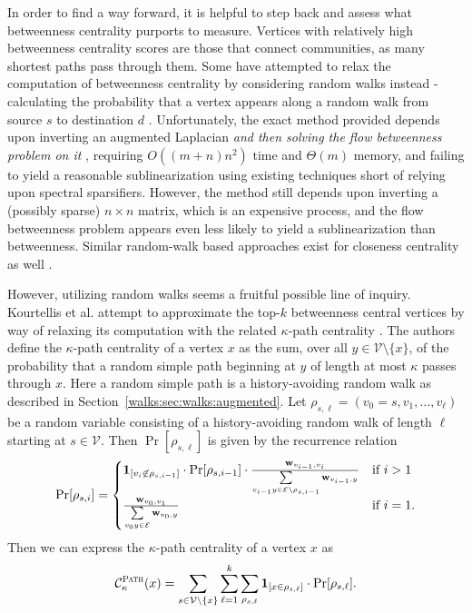 \documentclass[10]{report}
\newcommand{\algoname}[1]{\textnormal{\textsc{#1}}}
\begin{document}
In order to find a way forward, it is helpful to step back and assess what betweenness centrality purports to measure.
Vertices with relatively high betweenness centrality scores are those that connect communities, as many shortest paths pass through them.
Some have attempted to relax the computation of betweenness centrality by considering random walks instead - calculating the probability that a vertex appears along a random walk from source $s$ to destination $d$ \cite{newman2005measure}.
Unfortunately, the exact method provided depends upon inverting an augmented Laplacian \emph{and then solving the flow betweenness problem  on it} \cite{freeman1991centrality}, requiring $O((m + n) n^2)$ time and $\Theta(m)$ memory, and failing to yield a reasonable sublinearization using existing techniques short of relying upon spectral sparsifiers.
However, the method still depends upon inverting a (possibly sparse) $n \times n$ matrix, which is an expensive process, and the flow betweenness problem appears even less likely to yield a sublinearization than betweenness.
Similar random-walk based approaches exist for closeness centrality as well \cite{noh2002stability}.

However, utilizing random walks seems a fruitful possible line of inquiry.
Kourtellis et al. attempt to approximate the top-$k$ betweenness central vertices by way of relaxing its computation with the related $\kappa$-path centrality \cite{alahakoon2011k, kourtellis2013identifying}.
The authors define the $\kappa$-path centrality of a vertex $x$ as the sum, over all $y \in \mathcal{V} \setminus \{x\}$, of the probability that a random simple path beginning at $y$ of length at most $\kappa$ passes through $x$. 
Here a random simple path is a history-avoiding random walk as described in Section~\ref{walks:sec:walks:augmented}.
Let $\rho_{s, \ell} = (v_0 = s, v_1, \dots, v_\ell)$ be a random variable consisting of a history-avoiding random walk of length $\ell$ starting at $s \in \mathcal{V}$. 
Then $\Pr [ \rho_{s, \ell}]$ is given by the recurrence relation
%
\begin{equation} \label{eq:path:unweighted}
	\Pr[\rho_{s, i}] = 
	\begin{cases}
		\mathbf{1}_{[v_i \not \in \rho_{s, i-1}]}
		\cdot
		\Pr [\rho_{s, i-1}] 
		\cdot 
		\frac{\mathbf{w}_{v_{i-1},v_i}}{\sum\limits_{v_{i-1} y \in \mathcal{E} \setminus \rho_{s, i-1}} \mathbf{w}_{v_{i-1}, y}}
			& \textnormal{if $i > 1$} \\
		\frac{\mathbf{w}_{v_0,v_1}}{\sum\limits_{v_0 y \in \mathcal{E}} \mathbf{w}_{v_0, y}}
			& \textnormal{if $i = 1$}.
	\end{cases}
\end{equation}
%
Then we can express the $\kappa$-path centrality of a vertex $x$ as
%
\begin{equation} \label{eq:kpath}
	\mathcal{C}^{\algoname{Path}}_\kappa(x) = 
		\sum\limits_{s \in \mathcal{V} \setminus \{x\}} 
			\sum\limits_{\ell = 1}^k
				\sum\limits_{\rho_{s, \ell}}
					\mathbf{1}_{[x \in \rho_{s, \ell}]} \cdot \Pr [\rho_{s, \ell}].
%		
\end{equation}
%
\end{document}
